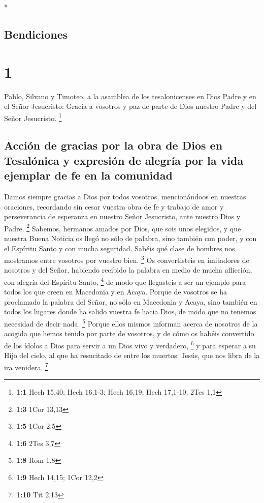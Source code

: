 \begin{paracol}{2} \switchcolumn[0]*

\hypertarget{bendiciones}{%
\subsection{Bendiciones}\label{bendiciones}}

\hypertarget{section}{%
\section{1}\label{section}}

 Pablo, Silvano y Timoteo, a la asamblea de los
tesalonicenses en Dios Padre y en el Señor Jesucristo: Gracia a vosotros
y paz de parte de Dios nuestro Padre y del Señor Jesucristo. \footnote{\textbf{1:1}
  Hech 15,40; Hech 16,1-3; Hech 16,19; Hech 17,1-10; 2Tes 1,1}

\hypertarget{acciuxf3n-de-gracias-por-la-obra-de-dios-en-tesaluxf3nica-y-expresiuxf3n-de-alegruxeda-por-la-vida-ejemplar-de-fe-en-la-comunidad}{%
\subsection{Acción de gracias por la obra de Dios en Tesalónica y
expresión de alegría por la vida ejemplar de fe en la
comunidad}\label{acciuxf3n-de-gracias-por-la-obra-de-dios-en-tesaluxf3nica-y-expresiuxf3n-de-alegruxeda-por-la-vida-ejemplar-de-fe-en-la-comunidad}}

 Damos siempre gracias a Dios por todos vosotros,
mencionándoos en nuestras oraciones,  recordando sin cesar
vuestra obra de fe y trabajo de amor y perseverancia de esperanza en
nuestro Señor Jesucristo, ante nuestro Dios y Padre. \footnote{\textbf{1:3}
  1Cor 13,13}  Sabemos, hermanos amados por Dios, que sois
unos elegidos,  y que nuestra Buena Noticia os llegó no
sólo de palabra, sino también con poder, y con el Espíritu Santo y con
mucha seguridad. Sabéis qué clase de hombres nos mostramos entre
vosotros por vuestro bien. \footnote{\textbf{1:5} 1Cor 2,5}
 Os convertisteis en imitadores de nosotros y del Señor,
habiendo recibido la palabra en medio de mucha aflicción, con alegría
del Espíritu Santo, \footnote{\textbf{1:6} 2Tes 3,7}  de
modo que llegasteis a ser un ejemplo para todos los que creen en
Macedonia y en Acaya.  Porque de vosotros se ha proclamado
la palabra del Señor, no sólo en Macedonia y Acaya, sino también en
todos los lugares donde ha salido vuestra fe hacia Dios, de modo que no
tenemos necesidad de decir nada. \footnote{\textbf{1:8} Rom 1,8}
 Porque ellos mismos informan acerca de nosotros de la
acogida que hemos tenido por parte de vosotros, y de cómo os habéis
convertido de los ídolos a Dios para servir a un Dios vivo y verdadero,
\footnote{\textbf{1:9} Hech 14,15; 1Cor 12,2}  y para
esperar a su Hijo del cielo, al que ha resucitado de entre los muertos:
Jesús, que nos libra de la ira venidera. \footnote{\textbf{1:10} Tit
  2,13}


\end{paracol}
